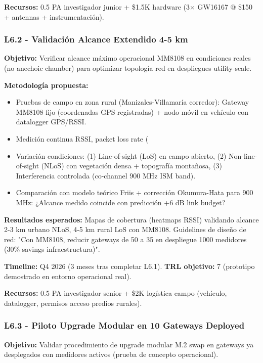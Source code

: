 \textbf{Recursos:} 0.5 PA investigador junior + \$1.5K hardware (3$\times$ GW16167 @ \$150 + antennas + instrumentación).

\subsubsection{L6.2 - Validación Alcance Extendido 4-5 km}

\textbf{Objetivo:} Verificar alcance máximo operacional MM8108 en condiciones reales (no anechoic chamber) para optimizar topología red en despliegues utility-scale.

\textbf{Metodología propuesta:}
\begin{itemize}
    \item Pruebas de campo en zona rural (Manizales-Villamaría corredor): Gateway MM8108 fijo (coordenadas GPS registradas) + nodo móvil en vehículo con datalogger GPS/RSSI.
    \item Medición continua RSSI, packet loss rate (%
    \item Variación condiciones: (1) Line-of-sight (LoS) en campo abierto, (2) Non-line-of-sight (NLoS) con vegetación densa + topografía montañosa, (3) Interferencia controlada (co-channel 900 MHz ISM band).
    \item Comparación con modelo teórico Friis + corrección Okumura-Hata para 900 MHz: ¿Alcance medido coincide con predicción +6 dB link budget?
\end{itemize}

\textbf{Resultados esperados:} Mapas de cobertura (heatmaps RSSI) validando alcance 2-3 km urbano NLoS, 4-5 km rural LoS con MM8108. Guidelines de diseño de red: "Con MM8108, reducir gateways de 50 a 35 en despliegue 1000 medidores (30\% savings infraestructura)".

\textbf{Timeline:} Q4 2026 (3 meses tras completar L6.1). \textbf{TRL objetivo:} 7 (prototipo demostrado en entorno operacional real).

\textbf{Recursos:} 0.5 PA investigador senior + \$2K logística campo (vehículo, datalogger, permisos acceso predios rurales).

\subsubsection{L6.3 - Piloto Upgrade Modular en 10 Gateways Deployed}

\textbf{Objetivo:} Validar procedimiento de upgrade modular M.2 swap en gateways ya desplegados con medidores activos (prueba de concepto operacional).

